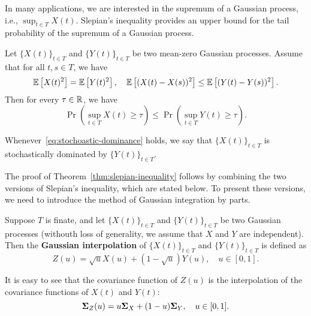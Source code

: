 In many applications, we are interested in the supremum of a Gaussian process, i.e., \(\sup_{t\in T}X(t)\). Slepian's inequality provides an upper bound for the tail probability of the supremum of a Gaussian process.

\begin{theorem}\label{thm:slepian-inequality}
	Let \(\{X(t)\}_{t\in T}\) and \(\{Y(t)\}_{t\in T}\) be two mean-zero Gaussian processes. Assume that for all \(t,s\in T\), we have
	\begin{equation*}
		\mathbb{E}\left[X(t)^{2}\right]=\mathbb{E}\left[Y(t)^{2}\right],\quad \mathbb{E}\left[(X(t)-X(s))^{2}\right]\leq\mathbb{E}\left[(Y(t)-Y(s))^{2}\right].
	\end{equation*}
	Then for every \(\tau\in\mathbb{R}\), we have
	\begin{equation}
		\label{eq:stochoastic-dominance}
		\Pr\left(\sup_{t\in T}X(t)\geq\tau\right)\leq\Pr\left(\sup_{t\in T}Y(t)\geq\tau\right).
	\end{equation}
\end{theorem}

\begin{remark}
	Whenever~\eqref{eq:stochoastic-dominance} holds, we say that \(\{X(t)\}_{t\in T}\) is stochastically dominated by \(\{Y(t)\}_{t\in T}\).
\end{remark}

The proof of Theorem~\ref{thm:slepian-inequality} follows by combining the two versions of Slepian's inequality, which are stated below. To present these versions, we need to introduce the method of Gaussian integration by parts.

\begin{definition}
	Suppose \(T\) is finate, and let \(\{X(t)\}_{t\in T}\) and \(\{Y(t)\}_{t\in T}\) be two Gaussian processes (withouth loss of generality, we assume that \(X\) and \(Y\) are independent). Then the \textbf{Gaussian interpolation} of \(\{X(t)\}_{t\in T}\) and \(\{Y(t)\}_{t\in T}\) is defined as
	\begin{equation*}
		Z(u)=\sqrt{u}X(u)+(1-\sqrt{u})Y(u),\quad u\in[0,1].
	\end{equation*}
\end{definition}

It is easy to see that the covariance function of \(Z(u)\) is the interpolation of the covariance functions of \(X(t)\) and \(Y(t)\):
\begin{equation*}
	\boldsymbol{\Sigma}_{Z}(u)=u\boldsymbol{\Sigma}_{X}+(1-u)\boldsymbol{\Sigma}_{Y},\quad u\in[0,1].
\end{equation*}

